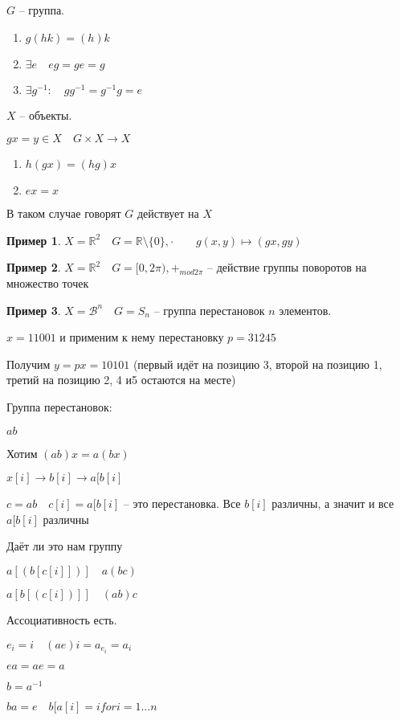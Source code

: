 \documentclass{book}
\newcommand\R{\ensuremath{\mathbb{R}}}
\theoremstyle{definition}
\newtheorem*{example}{Пример}
\begin{document}
\begin{definition}
    $G$ -- группа. 
     \begin{enumerate}
         \item $g(hk) = (h)k$
         \item  $\exists e\quad eg=ge=g$
         \item $ \exists g^{-1}:\quad g g^{-1} = g^{-1} g = e$
    \end{enumerate}

    $X$ -- объекты. 

     $gx=y\in X\quad G\times X\to X$
      \begin{enumerate}
          \item $h(gx) = (hg)x$
          \item $ex=x$
      \end{enumerate}

      В таком случае говорят $G$ действует на  $X$
\end{definition}

\begin{example}
    $X=\R^2\quad G = \R\setminus \{0\}, \cdot \qquad g(x,y)\mapsto (gx,gy)$
\end{example}
\begin{example}
    $X=\R^2\quad G = [0,2\pi ), +_{mod 2\pi}$ -- действие группы поворотов на множество точек
\end{example}
\begin{example}
    $X = \mathscr{B}^n\quad G = S_n$ -- группа перестановок  $n$ элементов.

     $x = 11001$ и применим к нему перестановку  $p = 31245$

     Получим  $y = px = 10101$ (первый идёт на позицию 3, второй на позицию 1, третий на позицию 2, 4 и5  остаются на месте)
\end{example}

\begin{definition}
    Группа перестановок: 

    $ab$

    Хотим $(ab)x=a(bx)$

    $x[i]\to b[i] \to a[b[i]$

    $c=ab\quad c[i] = a[b[i]$ -- это перестановка. Все  $b[i]$ различны, а значит и все  $a[b[i]$ различны

    Даёт ли это нам группу

    $a[(b[c[i]])]\quad a(bc)$

    $a[b[\left( c[i] \right) ]]\quad (ab)c$

    Ассоциативность есть.

    $e_i=i\quad (ae)i = a_{e_i} = a_i$

     $ea=ae=a$

     $b=a^{-1}$

     $ba=e\quad b[a[i] = i for i=1\ldots n$
\end{definition}
\end{document}
